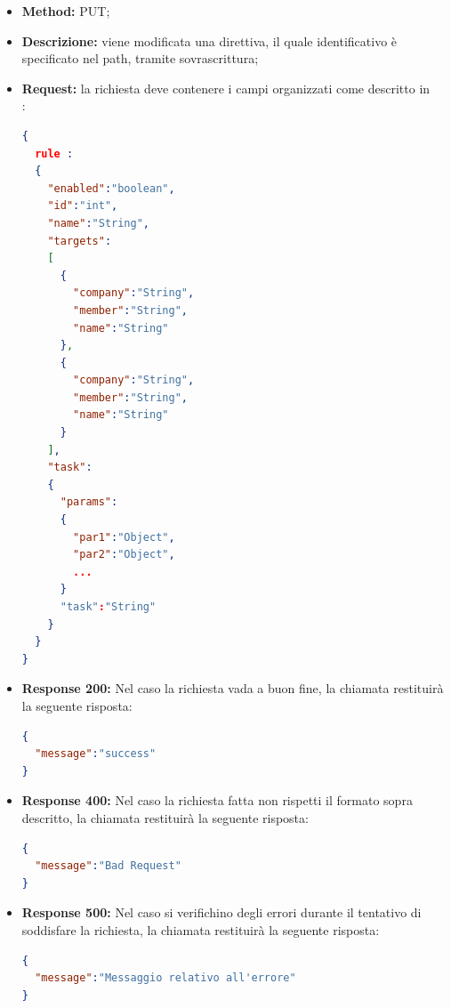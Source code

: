 \begin{itemize}
\begin{itemize}
\item \textbf{Method:} PUT;
\item \textbf{Descrizione:} viene modificata una direttiva, il quale identificativo è specificato nel path, tramite sovrascrittura;
\item \textbf{Request:} la richiesta deve contenere i campi organizzati come descritto in \\:
\begin{lstlisting}[language=json,firstnumber=1]
{
  rule :
  {
    "enabled":"boolean",
    "id":"int",
    "name":"String",
    "targets":
    [
      {
        "company":"String",
        "member":"String",
        "name":"String"
      },
      {
        "company":"String",
        "member":"String",
        "name":"String"
      }
    ],
    "task":
    {
      "params":
      {
        "par1":"Object",
        "par2":"Object",
        ...
      }
      "task":"String"
    }
  }
}
\end{lstlisting}
\item \textbf{Response 200:} Nel caso la richiesta vada a buon fine, la chiamata restituirà la seguente risposta:
\begin{lstlisting}[language=json,firstnumber=1]
{
  "message":"success"
}
\end{lstlisting}
\item \textbf{Response 400:} Nel caso la richiesta fatta non rispetti il formato sopra descritto, la chiamata restituirà la seguente risposta:
\begin{lstlisting}[language=json,firstnumber=1]
{
  "message":"Bad Request"
}
\end{lstlisting}
\item \textbf{Response 500:} Nel caso si verifichino degli errori durante il tentativo di soddisfare la richiesta, la chiamata restituirà la seguente risposta:
\begin{lstlisting}[language=json,firstnumber=1]
{
  "message":"Messaggio relativo all'errore"
}
\end{lstlisting}
\end{itemize}


\end{itemize}
